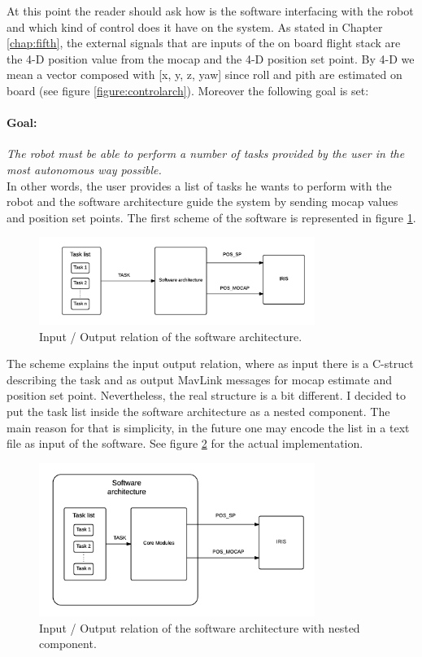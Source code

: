 At this point the reader should ask how is the software interfacing with the robot and which kind of control does it have on the system. As stated in Chapter \ref{chap:fifth}, the external signals that are inputs of the on board flight stack are the 4-D position value from the mocap and the 4-D position set point. By 4-D we mean a vector composed with [x, y, z, yaw] since roll and pith are estimated on board (see figure \ref{figure:controlarch}). Moreover the following goal is set:
\paragraph{Goal:} \textit{The robot must be able to perform a number of tasks provided by the user in the most autonomous way possible.} \\

\noindent
In other words, the user provides a list of tasks he wants to perform with the robot and the software architecture guide the system by sending mocap values and position set points. The first scheme of the software is represented in figure \ref{figure:inout}. 
\begin{figure}[h]
\centering
 \includegraphics[width=0.8\textwidth]{first_arch.png}
 \caption[In-out relation]{Input / Output relation of the software architecture.}
 \label{figure:inout}
\end{figure}
The scheme explains the input output relation, where as input there is a C-struct describing the task and as output MavLink messages for mocap estimate and position set point. Nevertheless, the real structure is a bit different. I decided to put the task list inside the software architecture as a nested component. The main reason for that is simplicity, in the future one may encode the list in a text file as input of the software. See figure \ref{figure:inoutnest} for the actual implementation.

\begin{figure}[h]
\centering
 \includegraphics[width=0.8\textwidth]{nested_arch.png}
 \caption[In-out relation for the nested arch]{Input / Output relation of the software architecture with nested component.}
 \label{figure:inoutnest}
\end{figure}


